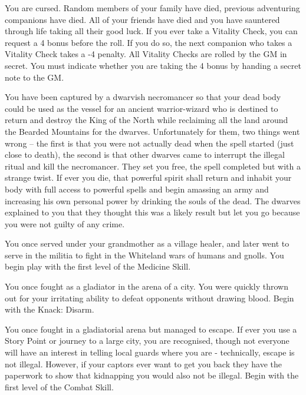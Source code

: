 \begin{list}{\addtocounter{list}{1}\textbf{:}}{\raggedleft}
\item{ You are cursed.  Random members of your family have died, previous adventuring companions have died.  All of your friends have died and you have sauntered through life taking all their good luck.  If you ever take a Vitality Check, you can request a 4 bonus before the roll.  If you do so, the next companion who takes a Vitality Check takes a -4 penalty.  All Vitality Checks are rolled by the GM in secret.  You must indicate whether you are taking the 4 bonus by handing a secret note to the GM. }

\item{ You have been captured by a dwarvish necromancer so that your dead body could be used as the vessel for an ancient warrior-wizard who is destined to return and destroy the King of the North while reclaiming all the land around the Bearded Mountains for the dwarves.  Unfortunately for them, two things went wrong -- the first is that you were not actually dead when the spell started (just close to death), the second is that other dwarves came to interrupt the illegal ritual and kill the necromancer.  They set you free, the spell completed but with a strange twist.  If ever you die, that powerful spirit shall return and inhabit your body with full access to powerful spells and begin amassing an army and increasing his own personal power by drinking the souls of the dead.  The dwarves explained to you that they thought this was a likely result but let you go because you were not guilty of any crime. }

\item{ You once served under your grandmother as a village healer, and later went to serve in the militia to fight in the Whiteland wars of humans and gnolls.  You begin play with the first level of the Medicine Skill. }

\item{ You once fought as a gladiator in the arena of a city.  You were quickly thrown out for your irritating ability to defeat opponents without drawing blood.  Begin with the Knack: Disarm. }

\item{ You once fought in a gladiatorial arena but managed to escape.  If ever you use a Story Point or journey to a large city, you are recognised, though not everyone will have an interest in telling local guards where you are - technically, escape is not illegal.  However, if your captors ever want to get you back they have the paperwork to show that kidnapping you would also not be illegal.  Begin with the first level of the Combat Skill. }


\end{list}
